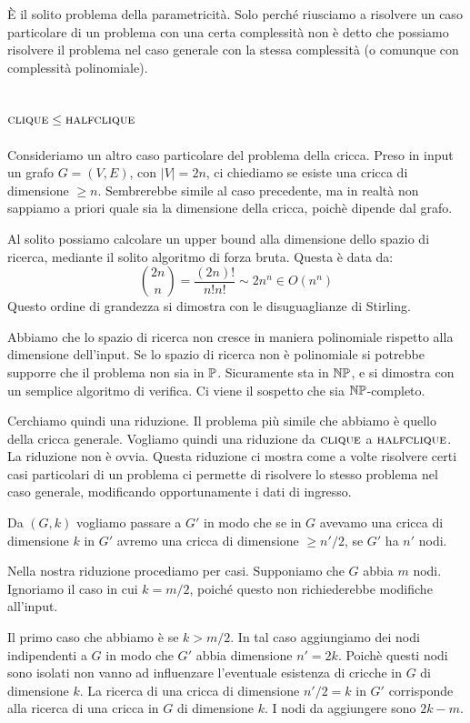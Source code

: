 È il solito problema della parametricità. Solo perché riusciamo a risolvere un caso particolare
di un problema con una certa complessità non è detto che possiamo risolvere il problema nel caso
generale con la stessa complessità (o comunque con complessità polinomiale).

\subsection{$\textsc{clique} \leq \textsc{halfclique}$}

Consideriamo un altro caso particolare del problema della cricca. Preso in input un grafo $G=(V,E)$,
con $|V| = 2n$, ci chiediamo se esiste una cricca di dimensione $\geq n$. Sembrerebbe simile al caso
precedente, ma in realtà non sappiamo a priori quale sia la dimensione della cricca, poichè
dipende dal grafo.

Al solito possiamo calcolare un upper bound alla dimensione dello spazio di ricerca, mediante il
solito algoritmo di forza bruta. Questa è data da:
\begin{equation*}
    \binom{2n}{n} = \frac{(2n)!}{n!n!} \sim 2n^{n} \in O(n^{n})
\end{equation*}
Questo ordine di grandezza si dimostra con le disuguaglianze di Stirling.

Abbiamo che lo spazio di ricerca non cresce in maniera polinomiale rispetto alla dimensione
dell'input. Se lo spazio di ricerca non è polinomiale si potrebbe supporre che il problema non sia
in $\mathbb{P}$. Sicuramente sta in $\mathbb{NP}$, e si dimostra con un semplice algoritmo di verifica. Ci
viene il sospetto che sia $\mathbb{NP}$-completo.

Cerchiamo quindi una riduzione. Il problema più simile che abbiamo è quello della cricca generale.
Vogliamo quindi una riduzione da $\textsc{clique}$ a $\textsc{halfclique}$. La riduzione non è ovvia. Questa
riduzione ci mostra come a volte risolvere certi casi particolari di un problema ci permette di
risolvere lo stesso problema nel caso generale, modificando opportunamente i dati di ingresso.

Da $(G,k)$ vogliamo passare a $G'$ in modo che se in $G$ avevamo una cricca di dimensione $k$ in
$G'$ avremo una cricca di dimensione $\geq n'/2$, se $G'$ ha $n'$ nodi.

Nella nostra riduzione procediamo per casi. Supponiamo che $G$ abbia $m$ nodi. Ignoriamo il caso in
cui $k = m/2$, poiché questo non richiederebbe modifiche all'input.

Il primo caso che abbiamo è se $k > m/2$.  In tal caso aggiungiamo dei nodi indipendenti a $G$
in modo che $G'$ abbia dimensione $n' = 2k$. Poichè questi nodi sono isolati non vanno ad
influenzare l'eventuale esistenza di cricche in $G$ di dimensione $k$. La ricerca di una cricca di
dimensione $n'/2 = k$ in $G'$ corrisponde alla ricerca di una cricca in $G$ di dimensione $k$. I
nodi da aggiungere sono $2k - m$.

